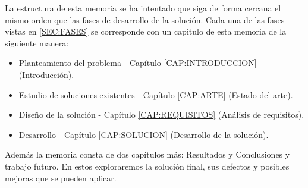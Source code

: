 La estructura de esta memoria se ha intentado que siga de forma cercana el mismo orden que las fases de desarrollo de la solución. Cada una de las fases vistas en \ref{SEC:FASES} se corresponde con un capitulo de esta memoria de la siguiente manera: 

\begin{itemize}
    \item Planteamiento del problema - Capítulo \ref{CAP:INTRODUCCION} (Introducción).
    \item Estudio de soluciones existentes - Capítulo \ref{CAP:ARTE} (Estado del arte).
    \item Diseño de la solución - Capítulo \ref{CAP:REQUISITOS} (Análisis de requisitos).
    \item Desarrollo - Capítulo \ref{CAP:SOLUCION} (Desarrollo de la solución).
\end{itemize}

Además la memoria consta de dos capítulos más: Resultados y Conclusiones y trabajo futuro. En estos exploraremos la solución final, sus defectos y posibles mejoras que se pueden aplicar.
